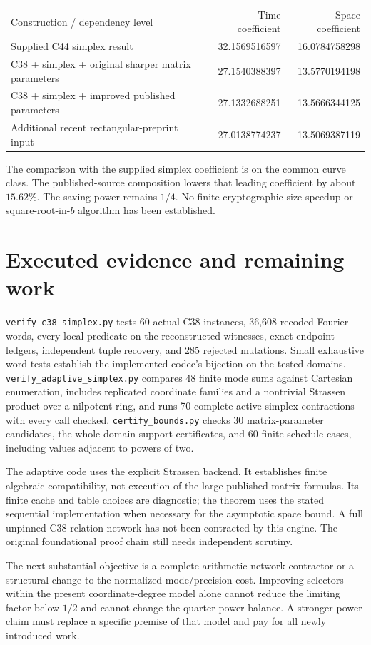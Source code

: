 \documentclass[11pt]{article}
\begin{document}
\begin{center}
\begin{tabular}{lrr}
Construction / dependency level & Time coefficient & Space coefficient\\
Supplied C44 simplex result &32.1569516597&16.0784758298\\
C38 + simplex + original sharper matrix parameters &27.1540388397&13.5770194198\\
C38 + simplex + improved published parameters &27.1332688251&13.5666344125\\
Additional recent rectangular-preprint input &27.0138774237&13.5069387119
\end{tabular}
\end{center}
The comparison with the supplied simplex coefficient is on the common
curve class. The published-source composition lowers that leading
coefficient by about $15.62\%$. The saving power remains $1/4$.
No finite cryptographic-size speedup or square-root-in-$b$ algorithm
has been established.

\section{Executed evidence and remaining work}
\texttt{verify\_c38\_simplex.py} tests 60 actual C38 instances,
36,608 recoded Fourier words, every local predicate on the reconstructed
witnesses, exact endpoint ledgers, independent tuple recovery, and
285 rejected mutations. Small exhaustive word tests establish the
implemented codec's bijection on the tested domains.
\texttt{verify\_adaptive\_simplex.py} compares 48 finite mode sums
against Cartesian enumeration, includes replicated coordinate families
and a nontrivial Strassen product over a nilpotent ring, and runs
70 complete active simplex contractions with every call checked.
\texttt{certify\_bounds.py} checks 30 matrix-parameter candidates,
the whole-domain support certificates, and 60 finite schedule cases,
including values adjacent to powers of two.

The adaptive code uses the explicit Strassen backend. It establishes
finite algebraic compatibility, not execution of the large published
matrix formulas. Its finite cache and table choices are diagnostic;
the theorem uses the stated sequential implementation when necessary
for the asymptotic space bound. A full unpinned C38 relation network
has not been contracted by this engine. The original foundational
proof chain still needs independent scrutiny.

The next substantial objective is a complete arithmetic-network
contractor or a structural change to the normalized mode/precision
cost. Improving selectors within the present coordinate-degree model
alone cannot reduce the limiting factor below $1/2$ and cannot change
the quarter-power balance. A stronger-power claim must replace a
specific premise of that model and pay for all newly introduced work.
\end{document}
